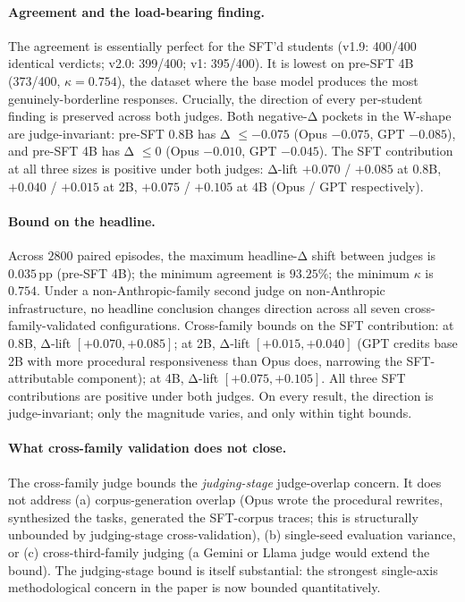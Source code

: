 \documentclass[10pt]{article}
\begin{document}
\paragraph{Agreement and the load-bearing finding.} The agreement is essentially perfect for the SFT'd students (v1.9: 400/400 identical verdicts; v2.0: 399/400; v1: 395/400). It is lowest on pre-SFT 4B (373/400, $\kappa=0.754$), the dataset where the base model produces the most genuinely-borderline responses. Crucially, the direction of every per-student finding is preserved across both judges. Both negative-Δ pockets in the W-shape are judge-invariant: pre-SFT 0.8B has Δ $\leq -0.075$ (Opus $-0.075$, GPT $-0.085$), and pre-SFT 4B has Δ $\leq 0$ (Opus $-0.010$, GPT $-0.045$). The SFT contribution at all three sizes is positive under both judges: Δ-lift $+0.070$ / $+0.085$ at 0.8B, $+0.040$ / $+0.015$ at 2B, $+0.075$ / $+0.105$ at 4B (Opus / GPT respectively).

\paragraph{Bound on the headline.} Across $2800$ paired episodes, the maximum headline-Δ shift between judges is $0.035$\,pp (pre-SFT 4B); the minimum agreement is $93.25\%$; the minimum $\kappa$ is $0.754$. Under a non-Anthropic-family second judge on non-Anthropic infrastructure, no headline conclusion changes direction across all seven cross-family-validated configurations. Cross-family bounds on the SFT contribution: at 0.8B, Δ-lift $[+0.070, +0.085]$; at 2B, Δ-lift $[+0.015, +0.040]$ (GPT credits base 2B with more procedural responsiveness than Opus does, narrowing the SFT-attributable component); at 4B, Δ-lift $[+0.075, +0.105]$. All three SFT contributions are positive under both judges. On every result, the direction is judge-invariant; only the magnitude varies, and only within tight bounds.

\paragraph{What cross-family validation does not close.} The cross-family judge bounds the \emph{judging-stage} judge-overlap concern. It does not address (a) corpus-generation overlap (Opus wrote the procedural rewrites, synthesized the tasks, generated the SFT-corpus traces; this is structurally unbounded by judging-stage cross-validation), (b) single-seed evaluation variance, or (c) cross-third-family judging (a Gemini or Llama judge would extend the bound). The judging-stage bound is itself substantial: the strongest single-axis methodological concern in the paper is now bounded quantitatively.
\end{document}

